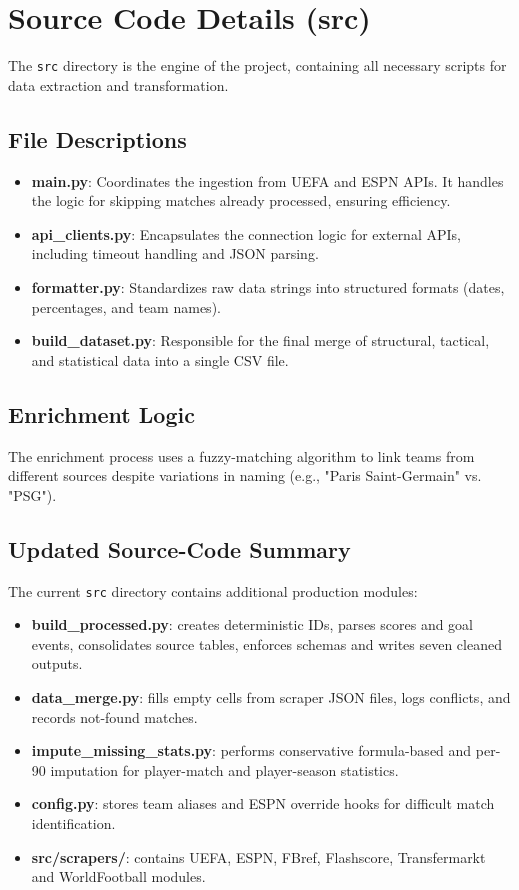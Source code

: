 \documentclass[12pt,a4paper]{article}
\begin{document}
\section{Source Code Details (src)}
The \texttt{src} directory is the engine of the project, containing all necessary scripts for data extraction and transformation.

\subsection{File Descriptions}
\begin{itemize}
    \item \textbf{main.py}: Coordinates the ingestion from UEFA and ESPN APIs. It handles the logic for skipping matches already processed, ensuring efficiency.
    \item \textbf{api\_clients.py}: Encapsulates the connection logic for external APIs, including timeout handling and JSON parsing.
    \item \textbf{formatter.py}: Standardizes raw data strings into structured formats (dates, percentages, and team names).
    \item \textbf{build\_dataset.py}: Responsible for the final merge of structural, tactical, and statistical data into a single CSV file.
\end{itemize}

\subsection{Enrichment Logic}
The enrichment process uses a fuzzy-matching algorithm to link teams from different sources despite variations in naming (e.g., "Paris Saint-Germain" vs. "PSG").

\subsection{Updated Source-Code Summary}
The current \texttt{src} directory contains additional production modules:
\begin{itemize}
    \item \textbf{build\_processed.py}: creates deterministic IDs, parses scores and goal events, consolidates source tables, enforces schemas and writes seven cleaned outputs.
    \item \textbf{data\_merge.py}: fills empty cells from scraper JSON files, logs conflicts, and records not-found matches.
    \item \textbf{impute\_missing\_stats.py}: performs conservative formula-based and per-90 imputation for player-match and player-season statistics.
    \item \textbf{config.py}: stores team aliases and ESPN override hooks for difficult match identification.
    \item \textbf{src/scrapers/}: contains UEFA, ESPN, FBref, Flashscore, Transfermarkt and WorldFootball modules.
\end{itemize}
\end{document}
